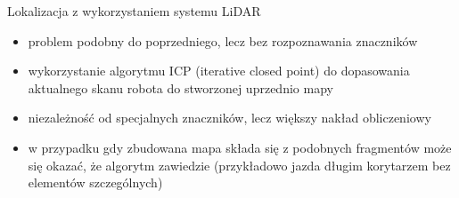 \begin{frame}
{Lokalizacja z wykorzystaniem systemu LiDAR}
	\begin{itemize}
		\item problem podobny do poprzedniego, lecz bez rozpoznawania znaczników
		\item wykorzystanie algorytmu ICP (iterative closed point) do dopasowania aktualnego skanu robota do stworzonej uprzednio mapy
		\item niezależność od specjalnych znaczników, lecz większy nakład obliczeniowy
		\item w przypadku gdy zbudowana mapa składa się z podobnych fragmentów może się okazać, że algorytm zawiedzie (przykładowo jazda długim korytarzem bez elementów szczególnych)
	\end{itemize}
\end{frame}

